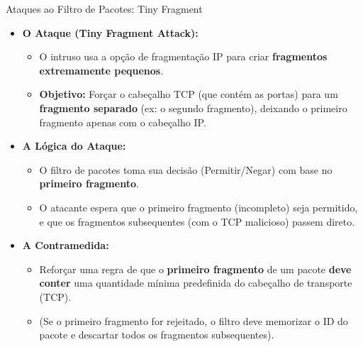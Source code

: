 \begin{frame}{Ataques ao Filtro de Pacotes: Tiny Fragment}
    \begin{itemize}
        \item \textbf{O Ataque (Tiny Fragment Attack):}
              \begin{itemize}
                  \item O intruso usa a opção de fragmentação IP para criar \textbf{fragmentos extremamente pequenos}.
                  \item \textbf{Objetivo:} Forçar o cabeçalho TCP (que contém as portas) para um \textbf{fragmento separado} (ex: o segundo fragmento), deixando o primeiro fragmento apenas com o cabeçalho IP.
              \end{itemize}

        \item \textbf{A Lógica do Ataque:}
              \begin{itemize}
                  \item O filtro de pacotes toma sua decisão (Permitir/Negar) com base no \textbf{primeiro fragmento}.
                  \item O atacante espera que o primeiro fragmento (incompleto) seja permitido, e que os fragmentos subsequentes (com o TCP malicioso) passem direto.
              \end{itemize}

        \item \textbf{A Contramedida:}
              \begin{itemize}
                  \item Reforçar uma regra de que o \textbf{primeiro fragmento} de um pacote \textbf{deve conter} uma quantidade mínima predefinida do cabeçalho de transporte (TCP).
                  \item (Se o primeiro fragmento for rejeitado, o filtro deve memorizar o ID do pacote e descartar todos os fragmentos subsequentes).
              \end{itemize}
    \end{itemize}
\end{frame}

